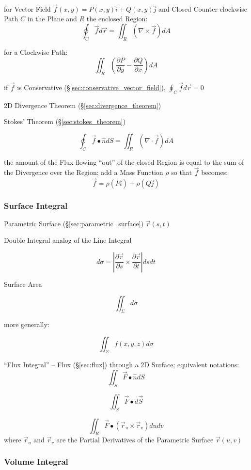 for Vector Field $\vec{f}(x,y) = P(x,y)\hat{i} + Q(x,y)\hat{j}$ and Closed
Counter-clockwise Path $C$ in the Plane and $R$ the enclosed Region:
\[
  \oint_C \vec{f} d\vec{r} = \iint_R (\nabla \times \vec{f}) dA
\]

for a Clockwise Path:
\[
  \iint_R (\frac{\partial{P}}{\partial{y}} - \frac{\partial{Q}}{\partial{x}}) dA
\]

if $\vec{f}$ is Conservative (\S\ref{sec:conservative_vector_field}), $\oint_C
\vec{f} d\vec{r} = 0$

\fist 2D Divergence Theorem (\S\ref{sec:divergence_theorem})

\fist Stokes' Theorem (\S\ref{sec:stokes_theorem})

\[
  \oint_C \vec{f} \bullet \hat{n} dS = \iint_R (\nabla \cdot \vec{f}) dA
\]

the amount of the Flux flowing ``out'' of the closed Region is equal to the sum
of the Divergence over the Region; add a Mass Function $\rho$ so that $\vec{f}$
becomes:
\[
  \vec{f} = \rho(P\hat{i}) + \rho(Q\hat{j})
\]



\subsubsection{Surface Integral}\label{sec:surface_integral}

Parametric Surface (\S\ref{sec:parametric_surface})
$\vec{r}(s,t)$

Double Integral analog of the Line Integral

\[
  d\sigma =
    |\frac{\partial{\vec{r}}}{\partial{s}}
      \times \frac{\partial{\vec{r}}}{\partial{t}}| ds dt
\]

Surface Area

\[
  {\iint}_{\Sigma} d\sigma
\]

more generally:

\[
  {\iint}_{\Sigma} f(x,y,z) d\sigma
\]

``Flux Integral'' -- Flux (\S\ref{sec:flux}) through a 2D Surface; equivalent
notations:
\[
  \iint_{S} \vec{F} \bullet \hat{n} dS
\]

\[
  \iint_{S} \vec{F} \bullet d\vec{S}
\]

\[
  \iint_{R} \vec{F} \bullet (\vec{r}_u \times \vec{r}_v) du dv
\]
where $\vec{r}_u$ and $\vec{r}_v$ are the Partial Derivatives of the Parametric
Surface $\vec{r}(u,v)$



\subsubsection{Volume Integral}\label{sec:volume_integral}


